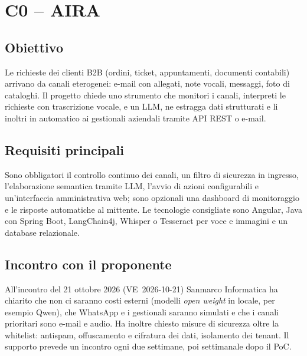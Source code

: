 
\section{C0 -- AIRA}\label{sec:c0}

\begin{scheda}
\end{scheda}

\subsection{Obiettivo}
Le richieste dei clienti B2B (ordini, ticket, appuntamenti, documenti
contabili) arrivano da canali eterogenei: e-mail con allegati, note
vocali, messaggi, foto di cataloghi. Il progetto chiede uno strumento che
monitori i canali, interpreti le richieste con trascrizione vocale,
 e un LLM, ne estragga dati strutturati e li inoltri in
automatico ai gestionali aziendali tramite API REST o e-mail.

\subsection{Requisiti principali}
Sono obbligatori il controllo continuo dei canali, un filtro di sicurezza
in ingresso, l'elaborazione semantica tramite LLM, l'avvio di azioni
configurabili e un'interfaccia amministrativa web; sono opzionali una
dashboard di monitoraggio e le risposte automatiche al mittente. Le
tecnologie consigliate sono Angular, Java con Spring Boot, LangChain4j,
Whisper o Tesseract per voce e immagini e un database relazionale.

\subsection{Incontro con il proponente}
All'incontro del 21 ottobre 2026 (VE~2026-10-21) Sanmarco Informatica ha
chiarito che non ci saranno costi esterni (modelli \emph{open weight} in
locale, per esempio Qwen), che WhatsApp e i gestionali saranno simulati e
che i canali prioritari sono e-mail e audio. Ha inoltre chiesto misure di
sicurezza oltre la whitelist: antispam, offuscamento e cifratura dei dati,
isolamento dei tenant. Il supporto prevede un incontro ogni due settimane,
poi settimanale dopo il PoC.

